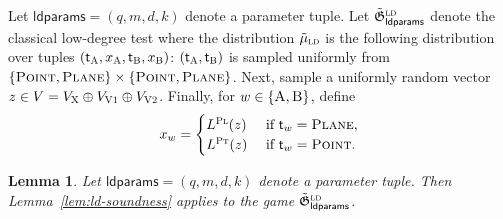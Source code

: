 \documentclass[11pt]{article}
\newtheorem{lemma}[theorem]{Lemma}
\theoremstyle{definition}
\newcommand{\ld}{\textsc{ld}}
\newcommand{\game}{\mathfrak{G}}
\newcommand{\labelstyle}[1]{\ensuremath{\textsc{#1}}\xspace}
\newcommand{\xpt}{\labelstyle{X}}
\newcommand{\dir}[1]{\labelstyle{V#1}}
\newcommand{\plf}{\labelstyle{Pl}}
\newcommand{\ptf}{\labelstyle{Pt}}
\newcommand{\tvarstyle}[1]{\mathsf{#1}}
\newcommand{\tvar}{\ensuremath{\tvarstyle{t}}}
\newcommand{\alice}{\labelstyle{A}}
\newcommand{\bob}{\labelstyle{B}}
\newcommand{\ab}{\{\alice, \bob\}}
\newcommand{\typestyle}[1]{\ensuremath{\textsc{#1}}\xspace}
\newcommand{\Plane}{\typestyle{Plane}}
\newcommand{\Point}{\typestyle{Point}}
\newcommand{\ldparams}{\mathsf{ldparams}}
\begin{document}
Let $\ldparams = (q,m,d,k)$ denote a parameter tuple.
Let $\tilde{\game}^\ld_\ldparams$ denote the classical low-degree test where the
distribution $\tilde{\mu}_\ld$ is the following distribution over tuples
$(\tvar_\alice,x_\alice,\tvar_\bob,x_\bob)$: $(\tvar_\alice,\tvar_\bob)$ is
sampled uniformly from $\{\Point,\Plane\} \times \{\Point,\Plane\}$.
Next, sample a uniformly random vector $z \in V = V_\xpt\oplus V_{\dir{1}}\oplus
V_{\dir{2}}$.
Finally, for $w \in \ab$, define
\begin{equation*}
 x_w =
 \begin{cases}
   L^\plf(z) & \text{ if } \tvar_w = \Plane,\\
   L^\ptf(z) & \text{ if } \tvar_w = \Point.
 \end{cases}
\end{equation*}

\begin{lemma}
  \label{lem:relax-dude}
  Let $\ldparams = (q,m,d,k)$ denote a parameter tuple.
  Then Lemma~\ref{lem:ld-soundness} applies to the game
  $\tilde{\game}^\ld_\ldparams$.
\end{lemma}
\end{document}
